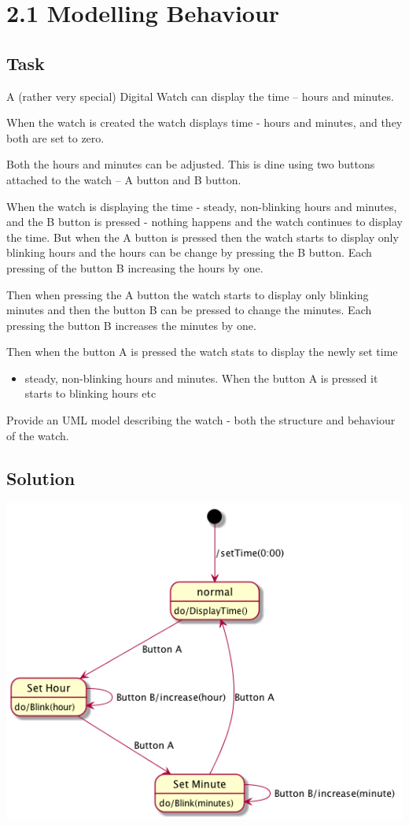\documentclass[11pt]{article}
\begin{document}
\section{2.1 Modelling Behaviour}
\label{sec:orgheadline6}
\subsection{Task}
\label{sec:orgheadline4}
A (rather very special) Digital Watch can display the time -- hours and minutes.

When the watch is created the watch displays time - hours and minutes,
and they both are set to zero.

Both the hours and minutes can be adjusted.
This is dine using two buttons attached to the watch – A button and B button.

When the watch is displaying the time - steady, non-blinking hours and minutes,
and the B button is pressed - nothing happens and the watch continues to display the time.
But when the A button is pressed then the watch starts to display only blinking hours
and the hours can be change by pressing the B button.
Each pressing of the button B increasing the hours by one.

Then when pressing the A button the watch starts to display only blinking minutes
and then the button B can be pressed to change the minutes.
Each pressing the button B increases the minutes by one.

Then when the button A is pressed the watch stats to display the newly set time
\begin{itemize}
\item steady, non-blinking hours and minutes. When the button A is pressed it starts to blinking hours etc
\end{itemize}

Provide an UML model describing the watch - both the structure and behaviour of the watch.
\subsection{Solution}
\label{sec:orgheadline5}
\includegraphics[width=.9\linewidth]{FState-20160109-SOLVED.png}
\end{document}
